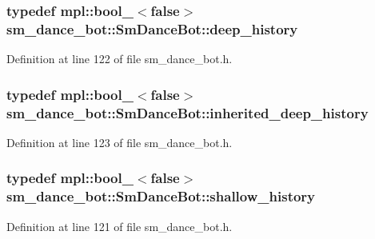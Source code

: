 \subsubsection[{\texorpdfstring{deep\+\_\+history}{deep_history}}]{\setlength{\rightskip}{0pt plus 5cm}typedef mpl\+::bool\+\_\+$<$false$>$ {\bf sm\+\_\+dance\+\_\+bot\+::\+Sm\+Dance\+Bot\+::deep\+\_\+history}}\hypertarget{structsm__dance__bot_1_1SmDanceBot_abd58ec4a2b50a45da304a5f0b9c44706}{}\label{structsm__dance__bot_1_1SmDanceBot_abd58ec4a2b50a45da304a5f0b9c44706}


Definition at line 122 of file sm\+\_\+dance\+\_\+bot.\+h.

\subsubsection[{\texorpdfstring{inherited\+\_\+deep\+\_\+history}{inherited_deep_history}}]{\setlength{\rightskip}{0pt plus 5cm}typedef mpl\+::bool\+\_\+$<$false$>$ {\bf sm\+\_\+dance\+\_\+bot\+::\+Sm\+Dance\+Bot\+::inherited\+\_\+deep\+\_\+history}}\hypertarget{structsm__dance__bot_1_1SmDanceBot_a9bc29171f1a5e3cfd09824a06f6a8058}{}\label{structsm__dance__bot_1_1SmDanceBot_a9bc29171f1a5e3cfd09824a06f6a8058}


Definition at line 123 of file sm\+\_\+dance\+\_\+bot.\+h.

\subsubsection[{\texorpdfstring{shallow\+\_\+history}{shallow_history}}]{\setlength{\rightskip}{0pt plus 5cm}typedef mpl\+::bool\+\_\+$<$false$>$ {\bf sm\+\_\+dance\+\_\+bot\+::\+Sm\+Dance\+Bot\+::shallow\+\_\+history}}\hypertarget{structsm__dance__bot_1_1SmDanceBot_a780b2408077887cc9c888ed0a95bff68}{}\label{structsm__dance__bot_1_1SmDanceBot_a780b2408077887cc9c888ed0a95bff68}


Definition at line 121 of file sm\+\_\+dance\+\_\+bot.\+h.



